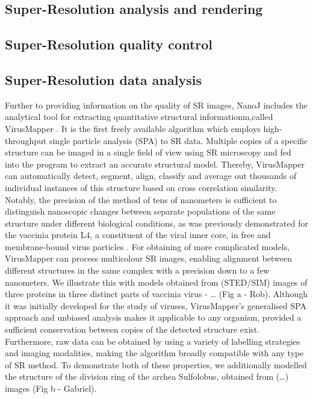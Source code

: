 \subsection*{Super-Resolution analysis and rendering}
\Blindtext

\subsection*{Super-Resolution quality control}
\Blindtext

\subsection*{Super-Resolution data analysis}
Further to providing information on the quality of SR images, NanoJ includes the analytical tool for extracting quantitative structural informationm,called VirusMapper  \cite{gray2016virus,gray2017}. It is the first freely available algorithm which employs high-throughput single particle analysis (SPA) to SR data. Multiple copies of a specific structure can be imaged in a single field of view using SR microscopy and fed into the program to extract an accurate structural model. Thereby, VirusMapper can automatically detect, segment, align, classify and average out thousands of individual instances of this structure based on cross correlation similarity. Notably, the precision of the method of tens of nanometers is sufficient to distinguish nanoscopic changes between separate populations of the same structure under different biological conditions, as was previously demonstrated for the vaccinia protein L4, a constituent of the viral inner core, in free and membrane-bound virus particles \cite{gray2016virus}. For obtaining of more complicated models, VirusMapper can process multicolour SR images, enabling alignment between different structures in the same complex with a precision down to a few nanometers. We illustrate this with models obtained from (STED/SIM) images of three proteins in three distinct parts of vaccinia virus - … (Fig a - Rob). 
\newline
Although it was initially developed for the study of viruses, VirusMapper’s generalised SPA approach and unbiased analysis makes it applicable to any organism, provided a sufficient conservation between copies of the detected structure exist. Furthermore, raw data can be obtained by using a variety of labelling strategies and imaging modalities, making the algorithm broadly compatible with any type of SR method. To demonstrate both of these properties, we additionally modelled the structure of the division ring of the archea Sulfolobus, obtained from (…) images (Fig b - Gabriel). 

